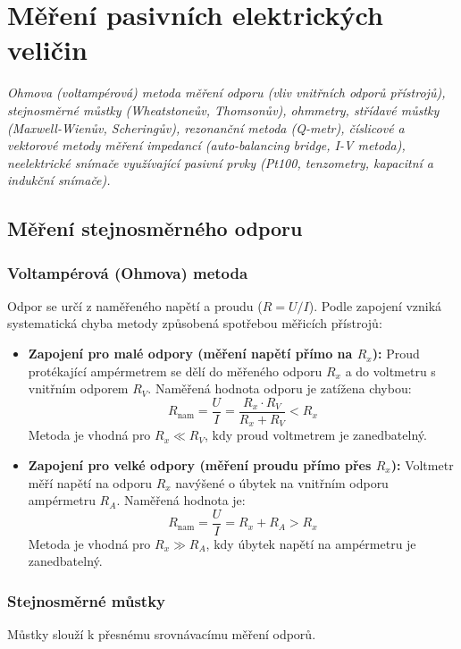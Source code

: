 \chapter{Měření pasivních elektrických veličin}
\label{ch:pasivni_veliciny}

\noindent\textit{Ohmova (voltampérová) metoda měření odporu (vliv vnitřních odporů přístrojů), stejnosměrné můstky (Wheatstoneův, Thomsonův), ohmmetry, střídavé můstky (Maxwell-Wienův, Scheringův), rezonanční metoda (Q-metr), číslicové a vektorové metody měření impedancí (auto-balancing bridge, I-V metoda), neelektrické snímače využívající pasivní prvky (Pt100, tenzometry, kapacitní a indukční snímače).}

\section{Měření stejnosměrného odporu}

\subsection{Voltampérová (Ohmova) metoda}
Odpor se určí z naměřeného napětí a proudu ($R = U/I$). Podle zapojení vzniká systematická chyba metody způsobená spotřebou měřicích přístrojů:

\begin{itemize}
    \item \textbf{Zapojení pro malé odpory (měření napětí přímo na $R_x$):}
          Proud protékající ampérmetrem se dělí do měřeného odporu $R_x$ a do voltmetru s vnitřním odporem $R_V$. Naměřená hodnota odporu je zatížena chybou:
          \[ R_{\text{nam}} = \frac{U}{I} = \frac{R_x \cdot R_V}{R_x + R_V} < R_x \]
          Metoda je vhodná pro $R_x \ll R_V$, kdy proud voltmetrem je zanedbatelný.
    \item \textbf{Zapojení pro velké odpory (měření proudu přímo přes $R_x$):}
          Voltmetr měří napětí na odporu $R_x$ navýšené o úbytek na vnitřním odporu ampérmetru $R_A$. Naměřená hodnota je:
          \[ R_{\text{nam}} = \frac{U}{I} = R_x + R_A > R_x \]
          Metoda je vhodná pro $R_x \gg R_A$, kdy úbytek napětí na ampérmetru je zanedbatelný.
\end{itemize}

\subsection{Stejnosměrné můstky}
Můstky slouží k přesnému srovnávacímu měření odporů.

